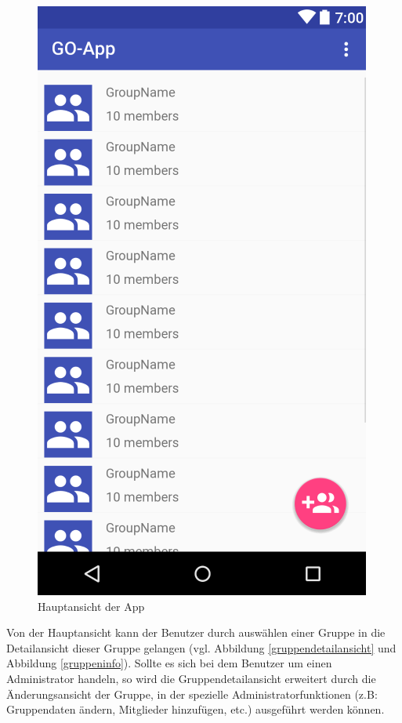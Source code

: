 \documentclass[parskip=full]{scrartcl}
\begin{document}
\begin{figure}[H]
\begin{minipage}[b]{0.4\textwidth}
    \includegraphics[width=\textwidth]{GUI/AndroidStudio/hauptansicht.PNG}
	\caption{Hauptansicht der App}	\label{hauptansicht}
  \end{minipage}
  \vspace{1cm}
\end{figure}

Von der Hauptansicht kann der Benutzer durch auswählen einer Gruppe in die Detailansicht dieser Gruppe gelangen (vgl. Abbildung \ref{gruppendetailansicht} und Abbildung \ref{gruppeninfo}). Sollte es sich bei dem Benutzer um einen Administrator handeln, so wird die Gruppendetailansicht erweitert durch die Änderungsansicht der Gruppe, in der spezielle Administratorfunktionen (z.B: Gruppendaten ändern, Mitglieder hinzufügen, etc.) ausgeführt werden können.
\end{document}

